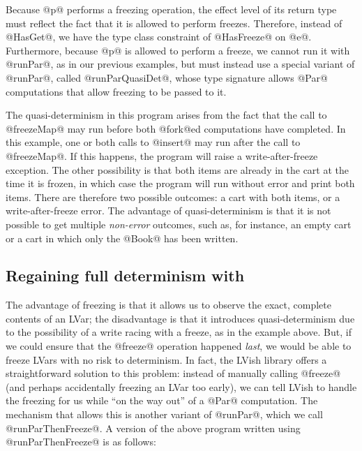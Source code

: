 Because @p@ performs a freezing operation, the effect level of its
return type must reflect the fact that it is allowed to perform
freezes.  Therefore, instead of @HasGet@, we have the type class
constraint of @HasFreeze@ on @e@.  Furthermore, because @p@ is allowed
to perform a freeze, we cannot run it with @runPar@, as in our
previous examples, but must instead use a special variant of @runPar@,
called @runParQuasiDet@, whose type signature allows @Par@
computations that allow freezing to be passed to it.

The quasi-determinism in this program arises from the fact that the
call to @freezeMap@ may run before both @fork@ed computations have
completed.  In this example, one or both calls to @insert@ may run
after the call to @freezeMap@.  If this happens, the program will
raise a write-after-freeze exception.  The other possibility is that
both items are already in the cart at the time it is frozen, in which
case the program will run without error and print both items.  There
are therefore two possible outcomes: a cart with both items, or a
write-after-freeze error.  The advantage of quasi-determinism is that
it is not possible to get multiple \emph{non-error} outcomes, such as,
for instance, an empty cart or a cart in which only the @Book@ has
been written.

\subsection{Regaining full determinism with }\label{subsection:lvish-regaining-full-determinism-with-runparthenfreeze}

The advantage of freezing is that it allows us to observe the exact,
complete contents of an LVar; the disadvantage is that it introduces
quasi-determinism due to the possibility of a write racing with a
freeze, as in the example above.  But, if we could ensure that the
@freeze@ operation happened \emph{last}, we would be able to freeze
LVars with no risk to determinism.  In fact, the LVish library offers
a straightforward solution to this problem: instead of manually
calling @freeze@ (and perhaps accidentally freezing an LVar too
early), we can tell LVish to handle the freezing for us while ``on the
way out'' of a @Par@ computation.  The mechanism that allows this is
another variant of @runPar@, which we call @runParThenFreeze@.  A
version of the above program written using @runParThenFreeze@ is as
follows:

\singlespacing

\doublespacing

